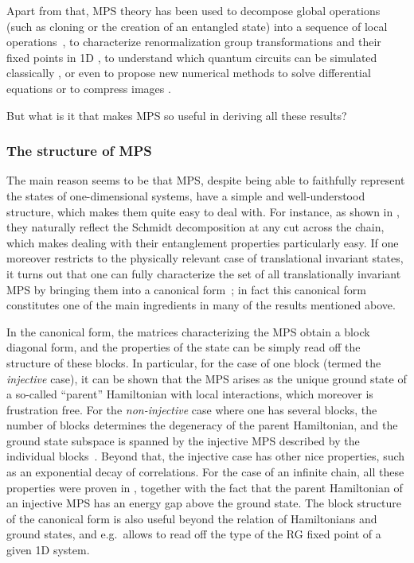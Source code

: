 \documentclass{article}
\theoremstyle{plain}
\theoremstyle{definition}
\numberwithin{equation}{section}  %
\begin{document}
Apart from that, MPS theory has been used to decompose global operations
(such as cloning or the creation of an entangled state) into a sequence of
local operations~\cite{schoen:hen-and-egg,lamata:sequential-operations},
to characterize renormalization group transformations and their fixed
points in 1D \cite{frank:renorm-MPS}, to understand which quantum circuits
can be simulated classically \cite{vidal:simulation-of-comput}, or even to
propose new numerical methods to solve differential equations
\cite{iblisdir:cont-mps} or to compress images
\cite{latorre:imagecompression}.

But what
is it that makes MPS so useful in deriving all these results?

\subsubsection{The structure of MPS}

The main reason seems to be that MPS, despite being able to faithfully
represent the states of one-dimensional systems, have a simple and
well-understood structure, which makes them quite easy to deal with. For
instance, as shown in \cite{vidal:simulation-of-comput}, they naturally
reflect the Schmidt decomposition at any cut across the chain, which makes
dealing with their
entanglement properties particularly easy.
If one moreover restricts to the physically
relevant case of translational invariant states, it turns out that one can
fully characterize the set of all translationally invariant MPS by
bringing them into a canonical
form~\cite{fannes:FCS,perez-garcia:mps-reps}; in fact this canonical form
constitutes one of the main ingredients in many of the results mentioned
above.

In the canonical form, the matrices characterizing the MPS obtain a block
diagonal form, and the properties of the state can be simply read off the
structure of these blocks. In particular, for the case of one block
(termed the \emph{injective} case), it can be shown that the MPS arises as
the unique ground state of a so-called ``parent'' Hamiltonian with local
interactions, which moreover is frustration free. For the
\emph{non-injective} case where one has several blocks, the number of
blocks determines the degeneracy of the parent Hamiltonian, and the ground
state subspace is spanned by the injective MPS described by the individual
blocks~\cite{perez-garcia:mps-reps}.  Beyond that, the injective case has
other nice properties, such as an exponential decay of correlations.  For
the case of an infinite chain, all these properties were proven in
\cite{fannes:FCS}, together with the fact that the parent Hamiltonian of
an injective MPS has an energy gap above the ground state.
The block structure of the canonical form is also useful beyond the
relation of Hamiltonians and ground states, and e.g.\ allows to read off
the type of the RG fixed point of a given 1D system.
\end{document}
